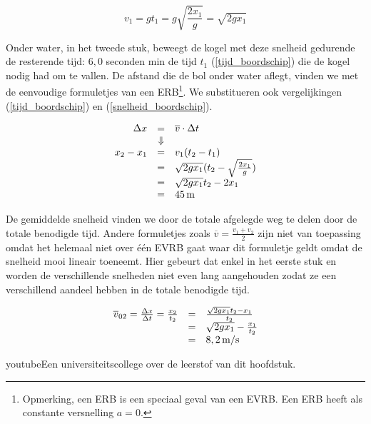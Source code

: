 \documentclass{ximera}
\begin{document}
\begin{exercise}
\begin{oplossing}
\[
v_1=gt_1\nonumber=g\sqrt{\frac{2x_1}{g}}\nonumber=\sqrt{2gx_1}
\]

Onder water, in het tweede stuk, beweegt de kogel met deze snelheid gedurende de resterende tijd: $6,0$ seconden min de tijd $t_1$ (\ref{tijd_boordschip}) die de kogel nodig had om te vallen. De afstand die de bol onder water aflegt, vinden we met de eenvoudige formuletjes van een ERB\footnote{Opmerking, een ERB is een speciaal geval van een EVRB. Een ERB heeft als constante versnelling $a=0$.}. We substitueren ook vergelijkingen (\ref{tijd_boordschip}) en (\ref{snelheid_boordschip}).

\[
\begin{array}{rcl}
\Delta x&=&\overline{v}\cdot\Delta t\\
&\Downarrow&\\
x_2-x_1&=&v_1(t_2-t_1)\\
&=&\sqrt{2gx_1}(t_2-\sqrt{\frac{2x_1}{g}})\\
&=&\sqrt{2gx_1}t_2-2x_1\\
&=&45\rm\,m
\end{array}
\]

De gemiddelde snelheid vinden we door de totale afgelegde weg te delen door de totale benodigde tijd. Andere formuletjes zoals $\overline{v}=\frac{v_1+v_2}{2}$ zijn niet van toepassing omdat het helemaal niet over \'e\'en EVRB gaat waar dit formuletje geldt omdat de snelheid mooi lineair toeneemt. Hier gebeurt dat enkel in het eerste stuk en worden de verschillende snelheden niet even lang aangehouden zodat ze een verschillend aandeel hebben in de totale benodigde tijd.

\[
\begin{array}{rcl}
\overline{v}_{02}=\frac{\Delta x}{\Delta t}=\frac{x_2}{t_2}&=&\frac{\sqrt{2gx_1}t_2-x_1}{t_2}\\
&=&\sqrt{2gx_1}-\frac{x_1}{t_2}\\
&=&8,2\rm\,m/s
\end{array}
\]

\end{oplossing}
\end{exercise}


\begin{expandable}{youtube}{Een universiteitscollege over de leerstof van dit hoofdstuk.}



\end{expandable}
\end{document}
